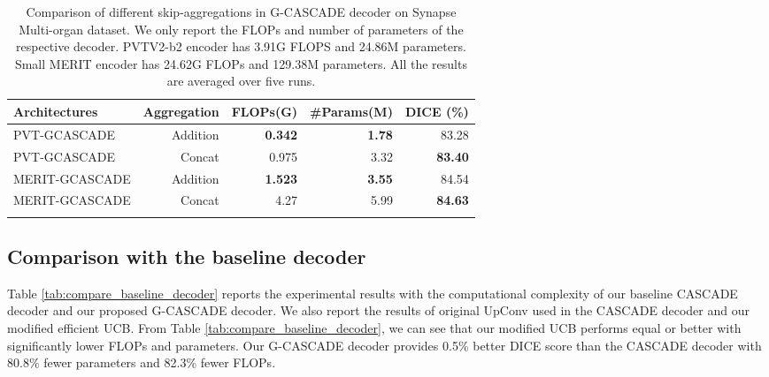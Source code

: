 \documentclass[10pt,twocolumn,letterpaper]{article}
\begin{document}
\begin{table}[t]
\centering 
    {\begin{adjustbox}{width=0.48\textwidth}
{\begin{tabular}{lrrrr}
\toprule
Architectures    &  Aggregation   &  \multicolumn{1}{c}{FLOPs(G)} & \multicolumn{1}{c}{\#Params(M)} & \multicolumn{1}{l}{DICE (\%)} \\
\midrule
PVT-GCASCADE            & Addition            & \textbf{0.342} & \textbf{1.78} & 83.28  \\
PVT-GCASCADE         & Concat                    & 0.975 & 3.32 & \textbf{83.40}      \\
\midrule 
MERIT-GCASCADE           & Addition                            & \textbf{1.523} & \textbf{3.55} & 84.54   \\
MERIT-GCASCADE        & Concat               & 4.27 & 5.99     & \textbf{84.63}   \\
\bottomrule \\
\end{tabular}}
\end{adjustbox}

}\caption{Comparison of different skip-aggregations in G-CASCADE decoder on Synapse Multi-organ dataset. We only report the FLOPs and number of parameters of the respective decoder. PVTV2-b2 encoder has 3.91G FLOPS and  24.86M parameters. Small MERIT encoder has 24.62G FLOPs and 129.38M parameters. All the results are averaged over five runs.}
\label{tab:gcascade_aggregation_results}
\end{table}

\subsection{Comparison with the baseline decoder}

Table \ref{tab:compare_baseline_decoder} reports the experimental results with the computational complexity of our baseline CASCADE decoder and our proposed G-CASCADE decoder. We also report the results of original UpConv used in the CASCADE decoder and our modified efficient UCB. From Table \ref{tab:compare_baseline_decoder}, we can see that our modified UCB performs equal or better with significantly lower FLOPs and parameters. Our G-CASCADE decoder provides 0.5\% better DICE score than the CASCADE decoder with 80.8\% fewer parameters and 82.3\% fewer FLOPs.        
\end{document}
